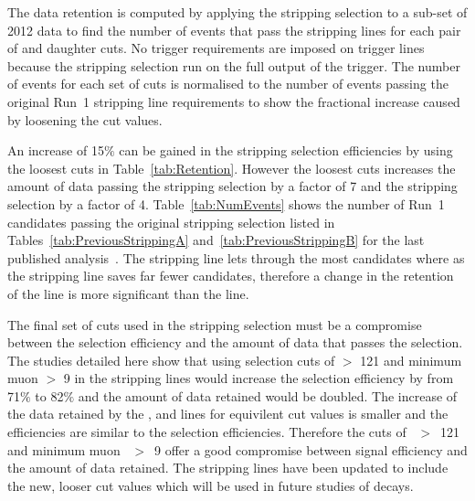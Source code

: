 The data retention is computed by applying the stripping selection to a sub-set of 2012 data to find the number of events that pass the stripping lines for each pair of \chiFD and daughter \chiIP cuts. No trigger requirements are imposed on trigger lines because the stripping selection run on the full output of the trigger. The number of events for each set of cuts is normalised to the number of events passing the original Run~1 stripping line requirements to show the fractional increase caused by loosening the cut values. 

An increase of 15$\%$ can be gained in the stripping selection efficiencies by using the loosest cuts in Table~\ref{tab:Retention}. However the loosest cuts increases the amount of data passing the \bmumu stripping selection by a factor of 7 and the \bhh stripping selection by a factor of 4. Table~\ref{tab:NumEvents} shows the number of Run~1 candidates passing the original stripping selection listed in Tables~\ref{tab:PreviousStrippingA} and~\ref{tab:PreviousStrippingB} for the last published analysis~\cite{Aaij:2013aka,CMS:2014xfa}. The \bhh stripping line lets through the most candidates where as the \bmumu stripping line saves far fewer candidates, therefore a change in the retention of the \bhh line is more significant than the \bmumu line. 


The final set of cuts used in the stripping selection must be a compromise between the selection efficiency and the amount of data that passes the selection. The studies detailed here show that using selection cuts of \bs \chiFD $>$ 121 and minimum muon \chiIP $>$ 9 in the stripping lines would increase the \bmumu selection efficiency by from 71$\%$ to 82$\%$ and the amount of data retained would be doubled. The increase of the data retained by the \bhh, \bujpsik and \bsjpsiphi lines for equivilent cut values is smaller and the efficiencies are similar to the \bmumu selection efficiencies. Therefore the cuts of \bs \chiFD~$>$~121 and minimum muon \chiIP~$>$~9 offer a good compromise between signal efficiency and the amount of data retained. The stripping lines have been updated to include the new, looser cut values which will be used in future studies of \bmumu decays. 

